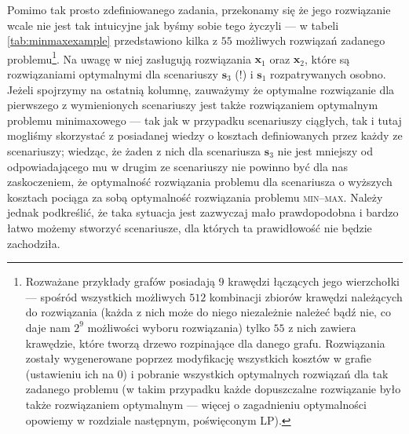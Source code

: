 Pomimo tak prosto zdefiniowanego zadania, przekonamy się że jego rozwiązanie wcale nie jest tak intuicyjne jak byśmy sobie tego życzyli --- w tabeli \ref{tab:minmaxexample} przedstawiono kilka z $55$ możliwych rozwiązań zadanego problemu\footnote{Rozważane przykłady grafów posiadają $9$ krawędzi łączących jego wierzchołki --- spośród wszystkich możliwych $512$ kombinacji zbiorów krawędzi należących do rozwiązania (każda z nich może do niego niezależnie należeć bądź nie, co daje nam $2^{9}$ możliwości wyboru rozwiązania) tylko $55$ z nich zawiera krawędzie, które tworzą drzewo rozpinające dla danego grafu. Rozwiązania zostały wygenerowane poprzez modyfikację wszystkich kosztów w grafie (ustawieniu ich na $0$) i pobranie wszystkich optymalnych rozwiązań dla tak zadanego problemu (w takim przypadku każde dopuszczalne rozwiązanie było także rozwiązaniem optymalnym --- więcej o zagadnieniu optymalności opowiemy w rozdziale następnym, poświęconym LP).}. Na uwagę w niej zasługują rozwiązania $\textbf{x}_{1}$ oraz $\textbf{x}_{2}$, które są rozwiązaniami optymalnymi dla scenariuszy $\textbf{s}_{3}$ (!) i $\textbf{s}_{1}$ rozpatrywanych osobno. Jeżeli spojrzymy na ostatnią kolumnę, zauważymy że optymalne rozwiązanie dla pierwszego z wymienionych scenariuszy jest także rozwiązaniem optymalnym problemu minimaxowego --- tak jak w przypadku scenariuszy ciągłych, tak i tutaj mogliśmy skorzystać z posiadanej wiedzy o kosztach definiowanych przez każdy ze scenariuszy; wiedząc, że żaden z nich dla scenariusza $\textbf{s}_{3}$ nie jest mniejszy od odpowiadającego mu w drugim ze scenariuszy nie powinno być dla nas zaskoczeniem, że optymalność rozwiązania problemu dla scenariusza o wyższych kosztach pociąga za sobą optymalność rozwiązania problemu \textsc{min--max}. Należy jednak podkreślić, że taka sytuacja jest zazwyczaj mało prawdopodobna i bardzo łatwo możemy stworzyć scenariusze, dla których ta prawidłowość nie będzie zachodziła.

